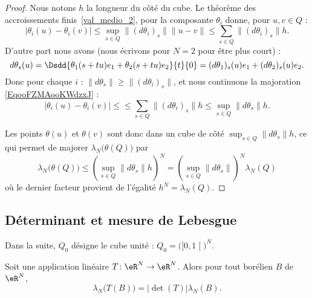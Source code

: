 \begin{proof}
	Nous notons \( h\) la longueur du côté du cube. Le théorème des accroissements finis~\ref{val_medio_2}, pour la composante \( \theta_i\) donne, pour \( u,v\in Q\) :
	\begin{equation}        \label{EqooFZMAooKWdzxJ}
		\big|  \theta_i(u)-\theta_i(v) \big|\leq\sup_{s\in Q}\| (d\theta_i)_s \|\| u-v \|\leq \sum_{s\in Q}\| (d\theta_i)_s \|h.
	\end{equation}
	D'autre part nous avons (nous écrivons pour \( N=2\) pour être plus court) :
	\begin{equation}
		d\theta_s(u)=\Dsdd{ \theta_1(s+tu)e_1+\theta_2(s+tu)e_2 }{t}{0}=(d\theta_1)_s(u)e_1+(d\theta_2)_s(u)e_2.
	\end{equation}
	Donc pour chaque \( i\) : \( \| d\theta_s \|\geq \| (d\theta_i)_s \|\), et nous continuons la majoration \eqref{EqooFZMAooKWdzxJ} :
	\begin{equation}
		\big|  \theta_i(u)-\theta_i(v) \big|\leq\leq \sum_{s\in Q}\| (d\theta_i)_s \|h\leq \sup_{s\in Q}\| d\theta_s \|h.
	\end{equation}

	Les points \( \theta(u)\) et \( \theta(v)\) sont donc dans un cube de côté \( \sup_{s\in Q}\| d\theta_s \|h\), ce qui permet de majorer \( \lambda_N\big( \theta(Q) \big)\) par
	\begin{equation}
		\lambda_N\big( \theta(Q) \big)\leq \left( \sup_{s\in Q}\| d\theta_s \|h \right)^N=\left( \sup_{s\in Q}\| d\theta_s \| \right)^N\lambda_N(Q)
	\end{equation}
	où le dernier facteur provient de l'égalité \( h^N=\lambda_N(Q)\).
\end{proof}

\subsection{Déterminant et mesure de Lebesgue}

Dans la suite, \( Q_0\) désigne le cube unité : \( Q_0=\big( \mathopen[ 0 , 1 \mathclose[ \big)^N\).

\begin{theorem}    \label{ThoBVIJooMkifod}
	Soit une application linéaire \( T\colon \eR^N\to \eR^N\). Alors pour tout borélien \( B\) de \( \eR^N\),
	\begin{equation}
		\lambda_N\big( T(B) \big)=| \det(T) |\lambda_N(B).
	\end{equation}
\end{theorem}

